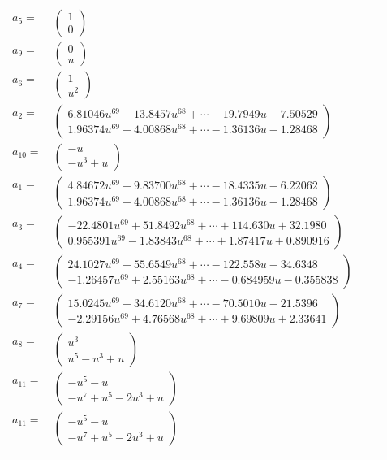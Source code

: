\documentclass[1p]{elsarticle_modified}
\theoremstyle{definition}
\begin{document}
\begin{tabular}{m{7pt} m{180pt} m{7pt} m{180pt} }
\flushright $a_{5}=$&$\begin{pmatrix}1\\0\end{pmatrix}$ \\
\flushright $a_{9}=$&$\begin{pmatrix}0\\u\end{pmatrix}$ \\
\flushright $a_{6}=$&$\begin{pmatrix}1\\u^2\end{pmatrix}$ \\
\flushright $a_{2}=$&$\begin{pmatrix}6.81046 u^{69}-13.8457 u^{68}+\cdots-19.7949 u-7.50529\\1.96374 u^{69}-4.00868 u^{68}+\cdots-1.36136 u-1.28468\end{pmatrix}$ \\
\flushright $a_{10}=$&$\begin{pmatrix}- u\\- u^3+u\end{pmatrix}$ \\
\flushright $a_{1}=$&$\begin{pmatrix}4.84672 u^{69}-9.83700 u^{68}+\cdots-18.4335 u-6.22062\\1.96374 u^{69}-4.00868 u^{68}+\cdots-1.36136 u-1.28468\end{pmatrix}$ \\
\flushright $a_{3}=$&$\begin{pmatrix}-22.4801 u^{69}+51.8492 u^{68}+\cdots+114.630 u+32.1980\\0.955391 u^{69}-1.83843 u^{68}+\cdots+1.87417 u+0.890916\end{pmatrix}$ \\
\flushright $a_{4}=$&$\begin{pmatrix}24.1027 u^{69}-55.6549 u^{68}+\cdots-122.558 u-34.6348\\-1.26457 u^{69}+2.55163 u^{68}+\cdots-0.684959 u-0.355838\end{pmatrix}$ \\
\flushright $a_{7}=$&$\begin{pmatrix}15.0245 u^{69}-34.6120 u^{68}+\cdots-70.5010 u-21.5396\\-2.29156 u^{69}+4.76568 u^{68}+\cdots+9.69809 u+2.33641\end{pmatrix}$ \\
\flushright $a_{8}=$&$\begin{pmatrix}u^3\\u^5- u^3+u\end{pmatrix}$ \\
\flushright $a_{11}=$&$\begin{pmatrix}- u^5- u\\- u^7+u^5-2 u^3+u\end{pmatrix}$\\ \flushright $a_{11}=$&$\begin{pmatrix}- u^5- u\\- u^7+u^5-2 u^3+u\end{pmatrix}$\\&\end{tabular}
\end{document}
